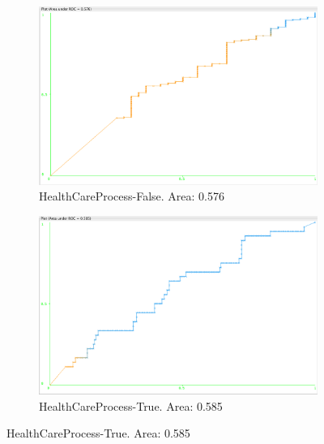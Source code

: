 \documentclass[11pt, notitlepage,abstracton,oneside]{article}   	%
\begin{document}
\begin{figure}[H]
    \begin{subfigure}[b]{0.45\textwidth}
        \centering
        \includegraphics[width=\textwidth]{figures/approach2/HealthCareProcess-False(0)}
        \caption{HealthCareProcess-False. Area: 0.576}
        \label{fig:HealthCareProcess-False(0)}
    \end{subfigure}
    \hfill
    \begin{subfigure}[b]{0.45\textwidth}
        \centering
        \includegraphics[width=\textwidth]{figures/approach2/HealthCareProcess-True(1)}
        \caption{HealthCareProcess-True. Area: 0.585}
        \label{fig:HealthCareProcess-True(1)}
    \end{subfigure}
    \hfill


\end{figure}
\end{document}
